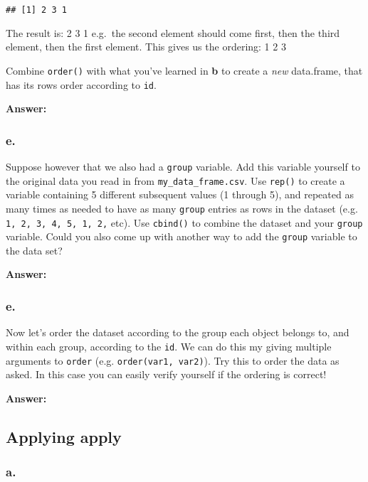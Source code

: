 \documentclass[]{article}
\begin{document}
\begin{verbatim}
## [1] 2 3 1
\end{verbatim}

The result is: 2 3 1 e.g.~the second element should come first, then the
third element, then the first element. This gives us the ordering: 1 2 3

Combine \texttt{order()} with what you've learned in \textbf{b} to
create a \emph{new} data.frame, that has its rows order according to
\texttt{id}.

\textbf{Answer:}

\hypertarget{e.-4}{%
\subsubsection{e.}\label{e.-4}}

Suppose however that we also had a \texttt{group} variable. Add this
variable yourself to the original data you read in from
\texttt{my\_data\_frame.csv}. Use \texttt{rep()} to create a variable
containing 5 different subsequent values (1 through 5), and repeated as
many times as needed to have as many \texttt{group} entries as rows in
the dataset (e.g. \texttt{1,\ 2,\ 3,\ 4,\ 5,\ 1,\ 2,} etc). Use
\texttt{cbind()} to combine the dataset and your \texttt{group}
variable. Could you also come up with another way to add the
\texttt{group} variable to the data set?

\textbf{Answer:}

\hypertarget{e.-5}{%
\subsubsection{e.}\label{e.-5}}

Now let's order the dataset according to the group each object belongs
to, and within each group, according to the \texttt{id}. We can do this
my giving multiple arguments to \texttt{order} (e.g.
\texttt{order(var1,\ var2)}). Try this to order the data as asked. In
this case you can easily verify yourself if the ordering is correct!

\textbf{Answer:}

\hypertarget{applying-apply}{%
\subsection{Applying apply}\label{applying-apply}}

\hypertarget{a.-7}{%
\subsubsection{a.}\label{a.-7}}
\end{document}
